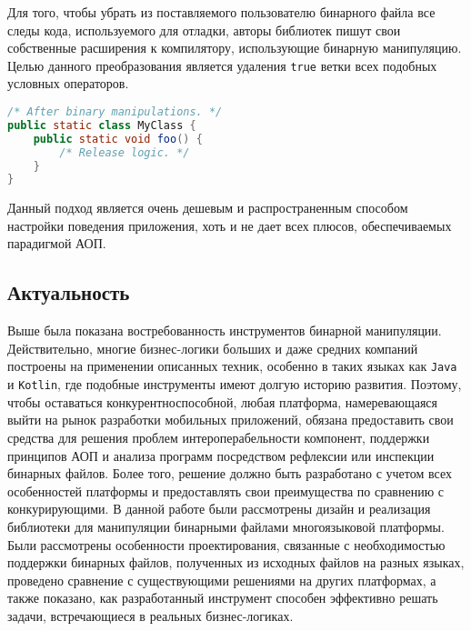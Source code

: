 Для того, чтобы убрать из поставляемого пользователю бинарного файла все следы кода, используемого для отладки, авторы библиотек пишут свои собственные расширения к компилятору, использующие бинарную манипуляцию. Целью данного преобразования является удаления \texttt{true} ветки всех подобных условных операторов.

\begin{lstlisting}[language=Java, caption=Результат работы преобразования, label=lst:debug]
/* After binary manipulations. */
public static class MyClass {
    public static void foo() {
        /* Release logic. */
    }
}
\end{lstlisting}

Данный подход является очень дешевым и распространенным способом настройки поведения приложения, хоть и не дает всех плюсов, обеспечиваемых парадигмой АОП.

\subsection{Актуальность}

Выше была показана востребованность инструментов бинарной манипуляции. Действительно, многие бизнес-логики больших и даже средних компаний построены на применении описанных техник, особенно в таких языках как \texttt{Java} и \texttt{Kotlin}, где подобные инструменты имеют долгую историю развития. Поэтому, чтобы оставаться конкурентноспособной, любая платформа, намеревающаяся выйти на рынок разработки мобильных приложений, обязана предоставить свои средства для решения проблем интероперабельности компонент, поддержки принципов АОП и анализа программ посредством рефлексии или инспекции бинарных файлов. Более того, решение должно быть разработано с учетом всех особенностей платформы и предоставлять свои преимущества по сравнению с конкурирующими. В данной работе были рассмотрены дизайн и реализация библиотеки для манипуляции бинарными файлами многоязыковой платформы. Были рассмотрены особенности проектирования, связанные с необходимостью поддержки бинарных файлов, полученных из исходных файлов на разных языках, проведено сравнение с существующими решениями на других платформах, а также показано, как разработанный инструмент способен эффективно решать задачи, встречающиеся в реальных бизнес-логиках.

\newpage
